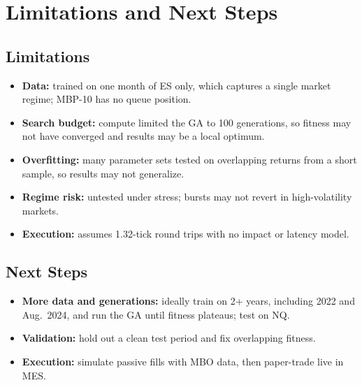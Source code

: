 \documentclass[11pt,letterpaper]{article}
\begin{document}
\section{Limitations and Next Steps}
\subsection{Limitations}
\begin{itemize}\setlength{\itemsep}{0pt}\setlength{\parskip}{0pt}
    \item \textbf{Data:} trained on one month of ES only, which captures a single market regime; MBP-10 has no queue position.
    \item \textbf{Search budget:} compute limited the GA to 100 generations, so fitness may not have converged and results may be a local optimum.
    \item \textbf{Overfitting:} many parameter sets tested on overlapping returns from a short sample, so results may not generalize.
    \item \textbf{Regime risk:} untested under stress; bursts may not revert in high-volatility markets.
    \item \textbf{Execution:} assumes 1.32-tick round trips with no impact or latency model.
\end{itemize}

\subsection{Next Steps}
\begin{itemize}\setlength{\itemsep}{0pt}\setlength{\parskip}{0pt}
    \item \textbf{More data and generations:} ideally train on 2+ years, including 2022 and Aug.\ 2024, and run the GA until fitness plateaus; test on NQ.
    \item \textbf{Validation:} hold out a clean test period and fix overlapping fitness.
    \item \textbf{Execution:} simulate passive fills with MBO data, then paper-trade live in MES.
\end{itemize}
 
\end{document}
